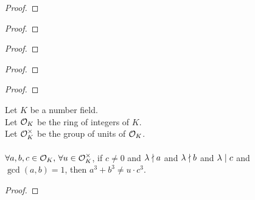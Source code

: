\begin{lemma}
    \label{lmm:Solution.two_le_multiplicity}
    \leanok
\end{lemma}
\begin{proof}
    \leanok
\end{proof}

\begin{lemma}
    \label{lmm:cube_add_cube_eq_mul}
    \leanok
\end{lemma}
\begin{proof}
    \leanok
\end{proof}

\begin{lemma}
    \label{lmm:lambda_sq_dvd_or_dvd_or_dvd}
    \leanok
\end{lemma}
\begin{proof}
    \leanok
\end{proof}

\begin{lemma}
    \label{lmm:ex_dvd_a_add_b}
    \leanok
\end{lemma}
\begin{proof}
    \leanok
\end{proof}

\begin{lemma}
    \label{lmm:exists_Solution_of_Solution'}
    \leanok
\end{lemma}
\begin{proof}
    \leanok
\end{proof}

\begin{theorem}
    \label{thm:fermatLastTheoremForThreeGen}
    \leanok
    Let $K$ be a number field. \\
    Let $\mathcal{O}_K$ be the ring of integers of $K$. \\
    Let $\mathcal{O}^\times_K$ be the group of units of $\mathcal{O}_K$. \\ \\
    $\forall a, b, c \in \mathcal{O}_K,\, \forall u \in \mathcal{O}^\times_K$, if $c \neq 0$
    and $\lambda \nmid a$ and $\lambda \nmid b$ and
    $\lambda \mid c$ and $\gcd(a,b)=1$, then $a^3 + b^3 \neq u \cdot c^3$.
\end{theorem}
\begin{proof}
    \leanok
\end{proof}

